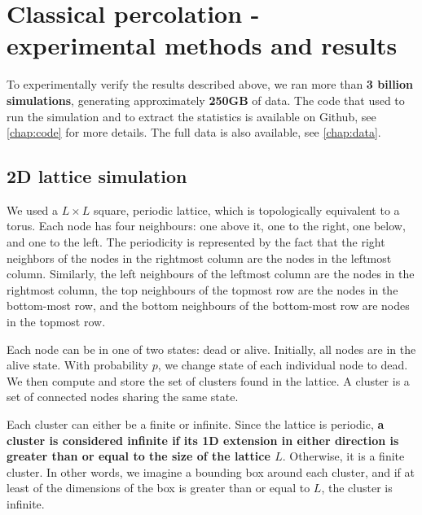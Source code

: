 \chapter{Classical percolation - experimental methods and results} 
\label{ch:classical_experimental}




To experimentally verify the results described above, we ran more than \textbf{3 billion simulations}, generating approximately \textbf{250GB} of data. The code that used to run the simulation and to extract the statistics is available on Github, see \autoref{chap:code} for more details. The full data is also available, see \autoref{chap:data}. 


\section{2D lattice simulation}
\label{sec:2d_lattice_simulation}


We used a $L \times L$ square, periodic lattice, which is topologically equivalent to a torus. Each node has four neighbours: one above it, one to the right, one below, and one to the left. The periodicity is represented by the fact that the right neighbors of the nodes in the rightmost column are the nodes in the leftmost column. Similarly, the left neighbours of the leftmost column are the nodes in the rightmost column, the top neighbours of the topmost row are the nodes in the bottom-most row, and the bottom neighbours of the bottom-most row are nodes in the topmost row.

Each node can be in one of two states: dead or alive. Initially, all nodes are in the alive state. With probability $p$, we change state of each individual node to dead. We then compute and store the set of clusters found in the lattice. A cluster is a set of connected nodes sharing the same state. 

Each cluster can either be a finite or infinite. Since the lattice is periodic, \textbf{a cluster is considered infinite if its 1D extension in either direction is greater than or equal to the size of the lattice $L$}. Otherwise, it is a finite cluster. In other words, we imagine a bounding box around each cluster, and if at least of the dimensions of the box is greater than or equal to $L$, the cluster is infinite. 

